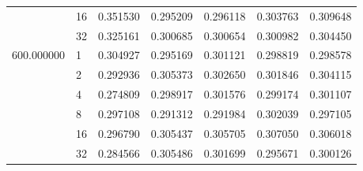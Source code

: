 \begin{tabular}{llrrrrr}
 & 16 & 0.351530 & 0.295209 & 0.296118 & 0.303763 & 0.309648 \\
 & 32 & 0.325161 & 0.300685 & 0.300654 & 0.300982 & 0.304450 \\
\multirow[c]{6}{*}{600.000000} & 1 & 0.304927 & 0.295169 & 0.301121 & 0.298819 & 0.298578 \\
 & 2 & 0.292936 & 0.305373 & 0.302650 & 0.301846 & 0.304115 \\
 & 4 & 0.274809 & 0.298917 & 0.301576 & 0.299174 & 0.301107 \\
 & 8 & 0.297108 & 0.291312 & 0.291984 & 0.302039 & 0.297105 \\
 & 16 & 0.296790 & 0.305437 & 0.305705 & 0.307050 & 0.306018 \\
 & 32 & 0.284566 & 0.305486 & 0.301699 & 0.295671 & 0.300126 \\
\end{tabular}

